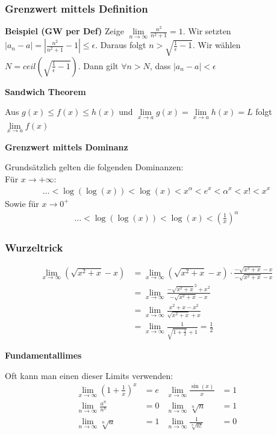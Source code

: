 \documentclass[25pt]{sciposter}
\newenvironment{method}[1]{\begin{mdframed}[backgroundcolor=blue!10,innertopmargin=15pt, innerbottommargin=15pt, nobreak=true]
		\textbf{#1 }
	}
	{ 
	\end{mdframed}
}
\begin{document}
\begin{multicols}{3}
\subsubsection*{Grenzwert mittels Definition}
\textbf{Beispiel (GW per Def)} Zeige $\lim\limits_{n \to \infty} \frac{n^2}{n^2 + 1} = 1$. Wir setzten $|a_n -a| = \left| \frac{n^2}{n^2 + 1} -1 \right| \leq \epsilon$. Daraus folgt $n > \sqrt{\frac{1}{\epsilon} -1}$. Wir wählen $N = ceil(\sqrt{\frac{1}{\epsilon} -1})$. Dann gilt $\forall n > N$, dass $|a_n - a| < \epsilon $


\begin{method}{Sandwich Theorem}
	Aus $g(x) \leq f(x) \leq h(x)$ und $\lim\limits_{x\to a} g(x) = \lim\limits_{x \to a} h(x) = L$ folgt $\lim\limits_{x \to a} f(x)$
\end{method}


\begin{method}{Grenzwert mittels Dominanz}
Grundsätzlich gelten die folgenden Dominanzen: \\
Für $x \to + \infty$:
\begin{align*}
	\ldots < \log(\log(x)) < \log(x) < x^\alpha < e^x < \alpha^x < x! < x^x
\end{align*}
Sowie für $x \to 0^+$
\begin{align*}
\ldots < \log(\log(x)) < \log(x) < \left(\frac{1}{x}\right)^\alpha
\end{align*}
\end{method}


\subsubsection*{Wurzeltrick}
\begin{align*}
	\lim\limits_{x \to \infty } \left( \sqrt{x^2 + x} -x \right) &= \lim\limits_{x \to \infty } \left( \sqrt{x^2 + x} -x \right)  \cdot \frac{  -\sqrt{x^2 + x} -x  }{ -\sqrt{x^2 + x} -x }\\
	&= 	\lim\limits_{x \to \infty } \frac{- \sqrt{x^2 + x} ^2 + x^2}{ -\sqrt{x^2 + x} -x}\\
	&= 	\lim\limits_{x \to \infty } \frac{x^2 + x - x^2}{ \sqrt{x^2 + x} +x}\\
	&=  \lim\limits_{x \to \infty}  \frac{1}{\sqrt{1 + \frac{1}{x}} + 1} = \frac{1}{2}
\end{align*}



\begin{method}{Fundamentallimes}
	Oft kann man einen dieser Limits verwenden:
	\begin{align*}
		\lim\limits_{x \to \infty} \left(1 + \frac{1}{x}\right)^x &= e &  \lim\limits_{x \to \infty} \frac{\sin(x)}{x} &= 1 \\
		\lim\limits_{n \to \infty} \frac{a^n}{n^n} &= 0 & 	\lim\limits_{n \to \infty} \sqrt[n]{n} &= 1\\
		\lim\limits_{n \to \infty} \sqrt[n]{a} &= 1  & 	\lim\limits_{n \to \infty} \frac{1}{\sqrt[n]{n!}} &= 0
	\end{align*}
\end{method}



\end{multicols}
\end{document}
